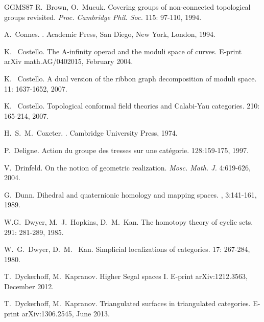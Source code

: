 \documentclass[english,11pt,leqno]{article}
\theoremstyle{definition}
\theoremstyle{remark}
\numberwithin{equation}{section}
\begin{document}
\begin{thebibliography}{GGMS87}
   R.~Brown, O.~Mucuk.
  \newblock Covering groups of non-connected topological groups
  revisited. \newblock
  {\em Proc. Cambridge Phil. Soc.} 115: 97-110, 1994. 
 
A.~Connes.
.
\newblock Academic Press, San Diego, New York, London, 1994.

K.~ Costello.
\newblock
The A-infinity operad and the moduli space of curves.  
\newblock E-print arXiv math.AG/0402015, February 2004.


K.~ Costello.
\newblock
A dual version of the ribbon graph decomposition of moduli space. 
 11: 1637-1652,    2007. 


 
 K.~ Costello.
\newblock
Topological conformal field theories and Calabi-Yau categories. 
 210: 165-214,  2007.   

 H.~S.~M.~Coxeter.
 .
 \newblock Cambridge University Press, 1974.

 P.~Deligne.
\newblock Action du groupe des tresses sur une cat\'egorie.
 128:159-175, 1997. 
 
  V.~Drinfeld.
 \newblock On the notion of geometric realization.
 \newblock 
 {\em  Mosc. Math. J.} 4:619-626,    2004. 
 
  G.~Dunn.
 \newblock 
 Dihedral and quaternionic homology and mapping spaces.
 , 3:141-161, 1989. 

 

 W.G.~Dwyer, M.~J.~Hopkins, D.~M.~Kan.
\newblock The homotopy theory of cyclic sets.
 291: 281-289, 1985. 

W.~G.~Dwyer, D.~M.~ Kan.
\newblock Simplicial localizations of categories. 
 17: 267-284, 1980.  

 T.~Dyckerhoff, M.~Kapranov.
\newblock Higher Segal spaces I. 
\newblock E-print arXiv:1212.3563, December 2012. 



T.~Dyckerhoff, M.~Kapranov.
\newblock
Triangulated surfaces in triangulated categories.
\newblock E-print arXiv:1306.2545, June 2013.


\end{thebibliography}
\end{document}

